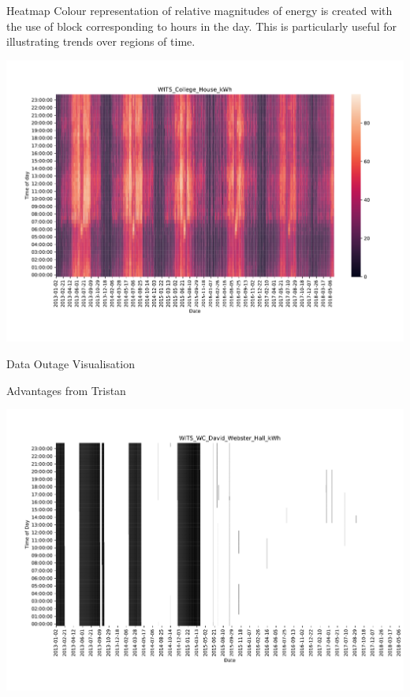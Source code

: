 \documentclass[8pt,xcolor={dvipsnames}]{beamer}
\begin{document}
{\begin{frame}{Heatmap}
Colour representation of relative magnitudes of energy is created with the use of block corresponding to hours in the day. This is particularly useful for illustrating trends over regions of time. 

\begin{center}
	\includegraphics[width=\textwidth, trim=30 30 70 50, clip]{HeatMapCollegeHouse}
\end{center}
\end{frame}


\begin{frame}{Data Outage Visualisation}

Advantages from Tristan

\begin{center}
	\includegraphics[width=\textwidth, trim=30 30 0 50, clip]{DataOutageDavidWebster}
\end{center}
\end{frame}


}
\end{document}
